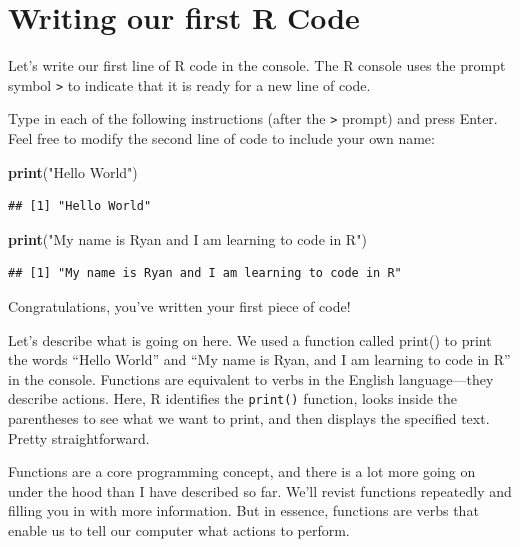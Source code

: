 \documentclass[
]{book}
\newenvironment{Shaded}{\begin{snugshade}}{\end{snugshade}}
\newcommand{\FunctionTok}[1]{\textcolor[rgb]{0.13,0.29,0.53}{\textbf{#1}}}
\newcommand{\NormalTok}[1]{#1}
\newcommand{\StringTok}[1]{\textcolor[rgb]{0.31,0.60,0.02}{#1}}
\begin{document}
\section{Writing our first R Code}\label{writing-our-first-r-code}

Let's write our first line of R code in the console. The R console uses the prompt symbol \texttt{\textgreater{}} to indicate that it is ready for a new line of code.

Type in each of the following instructions (after the \texttt{\textgreater{}} prompt) and press Enter. Feel free to modify the second line of code to include your own name:

\begin{Shaded}
\begin{Highlighting}[]
\FunctionTok{print}\NormalTok{(}\StringTok{"Hello World"}\NormalTok{)}
\end{Highlighting}
\end{Shaded}

\begin{verbatim}
## [1] "Hello World"
\end{verbatim}

\begin{Shaded}
\begin{Highlighting}[]
\FunctionTok{print}\NormalTok{(}\StringTok{"My name is Ryan and I am learning to code in R"}\NormalTok{)}
\end{Highlighting}
\end{Shaded}

\begin{verbatim}
## [1] "My name is Ryan and I am learning to code in R"
\end{verbatim}

Congratulations, you've written your first piece of code!

Let's describe what is going on here. We used a function called print() to print the words ``Hello World'' and ``My name is Ryan, and I am learning to code in R'' in the console. Functions are equivalent to verbs in the English language---they describe actions. Here, R identifies the \texttt{print()} function, looks inside the parentheses to see what we want to print, and then displays the specified text. Pretty straightforward.

Functions are a core programming concept, and there is a lot more going on under the hood than I have described so far. We'll revist functions repeatedly and filling you in with more information. But in essence, functions are verbs that enable us to tell our computer what actions to perform.
\end{document}
